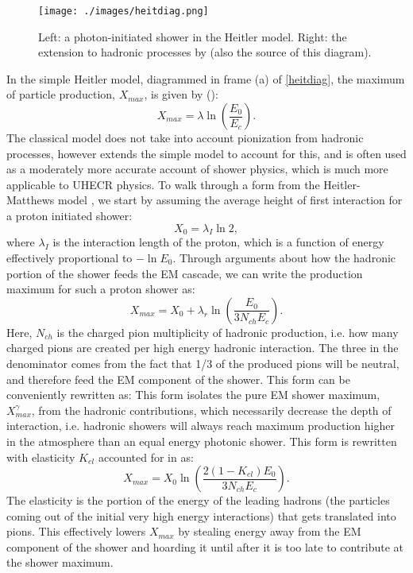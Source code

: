 \begin{figure}[h!]
\begin{center}
\texttt{[image: ./images/heitdiag.png]}
\caption[Heitler Model Diagram]{Left: a photon-initiated shower in the Heitler model. Right: the extension to hadronic processes by \textcite{matthews} (also the source of this diagram). }
\label{heitdiag}
\end{center}
\end{figure}

In the simple Heitler model, diagrammed in frame (a) of \autoref{heitdiag}, the maximum of particle production, $X_{max}$, is given by (\cite{stanev2}):
$$ X_{max}=\lambda \ln\left(\frac{E_0}{E_c}\right).$$
The classical model does not take into account pionization from hadronic processes, however \textcite{matthews} extends the simple model to account for this, and is often used as a moderately more accurate account of shower physics, which is much more applicable to UHECR physics. To walk through a form from the Heitler-Matthews model \cite{matthews}, we start by assuming the average height of first interaction for a proton initiated shower:
$$X_0=\lambda_I\ln{2},$$
where $\lambda_I$ is the interaction length of the proton, which is a function of energy effectively proportional to $-\ln E_0$. Through arguments about how the hadronic portion of the shower feeds the EM cascade, we can write the production maximum for such a proton shower as:
$$X_{max}=X_0+\lambda_r\ln\left(\frac{E_0}{3 N_{ch} E_c }\right).$$
Here, $N_{ch}$ is the charged pion multiplicity of hadronic production, i.e. how many charged pions are created per high energy hadronic interaction. The three in the denominator comes from the fact that 1/3 of the produced pions will be neutral, and therefore feed the EM component of the shower. This form can be conveniently rewritten as:
This form isolates the pure EM shower maximum, $X_{max}^\gamma$, from the hadronic contributions, which necessarily decrease the depth of interaction, i.e. hadronic showers will always reach maximum production higher in the atmosphere than an equal energy photonic shower. This form is rewritten with elasticity $K_{el}$ accounted for in \textcite{stanev2} as:
$$X_{max}= X_0 \ln\left(\frac{2(1-K_{el})E_0}{3 N_{ch} E_c}\right). $$
The elasticity is the portion of the energy of the leading hadrons (the particles coming out of the initial very high energy interactions) that gets translated into pions. This effectively lowers $X_{max}$ by stealing energy away from the EM component of the shower and hoarding it until after it is too late to contribute at the shower maximum.

